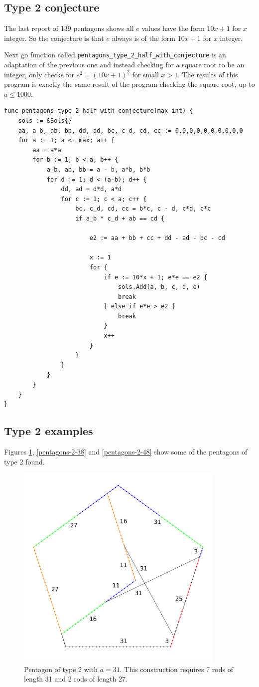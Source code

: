 \documentclass[11pt]{article}
\begin{document}
\subsection{Type 2 conjecture}
The last report of 139 pentagons shows all $e$ values have the form $10x + 1$ for $x$ integer.
So the conjecture is that $e$ always is of the form $10x + 1$ for $x$ integer.

Next go function called \texttt{pentagons\_type\_2\_half\_with\_conjecture}
is an adaptation of the previous one and instead checking for a square root to be an integer,
only checks for $e^2 = (10x+1)^2$ for small $x > 1$.
The results of this program is exactly the same result of the
program checking the square root, up to $a \leq 1000$.
\begin{lstlisting}
func pentagons_type_2_half_with_conjecture(max int) {
	sols := &Sols{}
	aa, a_b, ab, bb, dd, ad, bc, c_d, cd, cc := 0,0,0,0,0,0,0,0,0,0
	for a := 1; a <= max; a++ {
		aa = a*a
		for b := 1; b < a; b++ {
			a_b, ab, bb = a - b, a*b, b*b
			for d := 1; d < (a-b); d++ {
				dd, ad = d*d, a*d
				for c := 1; c < a; c++ {
					bc, c_d, cd, cc = b*c, c - d, c*d, c*c
					if a_b * c_d + ab == cd {

						e2 := aa + bb + cc + dd - ad - bc - cd

						x := 1
						for {
							if e := 10*x + 1; e*e == e2 {
								sols.Add(a, b, c, d, e)
								break
							} else if e*e > e2 {
								break
							}
							x++
						}
					}
				}
			}
		}
	}
}

\end{lstlisting} 

\subsection{Type 2 examples}

Figures \ref{pentagons-2-31}, \ref{pentagons-2-38} and \ref{pentagons-2-48} show some of the pentagons of type 2 found.

\begin{figure}
\centering
\includegraphics[width=10cm]{figs/pentagons-2-31}
\caption{Pentagon of type 2 with $a=31$. This construction requires 7 rods of 
length 31 and 2 rods of length 27.}
\label{pentagons-2-31}
\end{figure}
\end{document}
